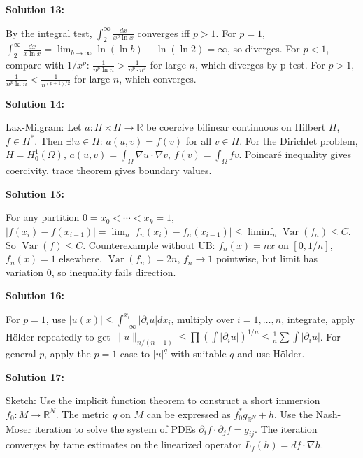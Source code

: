 \documentclass[12pt,a4paper]{exam}
\begin{document}
\vspace{0.5cm}

\textbf{Solution 13:}

By the integral test, $\int_2^{\infty} \frac{dx}{x^p \ln x}$ converges iff $p > 1$. For $p=1$, $\int_2^{\infty} \frac{dx}{x \ln x} = \lim_{b \to \infty} \ln(\ln b) - \ln(\ln 2) = \infty$, so diverges. For $p<1$, compare with $1/x^p$: $\frac{1}{n^p \ln n} > \frac{1}{n^p \cdot n^{\varepsilon}}$ for large $n$, which diverges by p-test. For $p>1$, $\frac{1}{n^p \ln n} < \frac{1}{n^{(p+1)/2}}$ for large $n$, which converges.

\vspace{0.5cm}

\textbf{Solution 14:}

Lax-Milgram: Let $a: H \times H \to \mathbb{R}$ be coercive bilinear continuous on Hilbert $H$, $f \in H^*$. Then $\exists! u \in H$: $a(u,v) = f(v)$ for all $v \in H$. For the Dirichlet problem, $H = H_0^1(\Omega)$, $a(u,v) = \int_\Omega \nabla u \cdot \nabla v$, $f(v) = \int_\Omega f v$. Poincar\'e inequality gives coercivity, trace theorem gives boundary values.

\vspace{0.5cm}

\textbf{Solution 15:}

For any partition $0 = x_0 < \cdots < x_k = 1$, $|f(x_i) - f(x_{i-1})| = \lim_n |f_n(x_i) - f_n(x_{i-1})| \leq \liminf_n \operatorname{Var}(f_n) \leq C$. So $\operatorname{Var}(f) \leq C$. Counterexample without UB: $f_n(x) = n x$ on $[0,1/n]$, $f_n(x)=1$ elsewhere. $\operatorname{Var}(f_n) = 2n$, $f_n \to 1$ pointwise, but limit has variation 0, so inequality fails direction.

\vspace{0.5cm}

\textbf{Solution 16:}

For $p=1$, use $|u(x)| \leq \int_{-\infty}^{x_i} |\partial_i u| dx_i$, multiply over $i=1,\ldots,n$, integrate, apply H\"older repeatedly to get $\|u\|_{n/(n-1)} \leq \prod (\int |\partial_i u|)^{1/n} \leq \frac{1}{n} \sum \int |\partial_i u|$. For general $p$, apply the $p=1$ case to $|u|^q$ with suitable $q$ and use H\"older.

\vspace{0.5cm}

\textbf{Solution 17:}

Sketch: Use the implicit function theorem to construct a short immersion $f_0: M \to \mathbb{R}^N$. The metric $g$ on $M$ can be expressed as $f_0^*g_{\mathbb{R}^N} + h$. Use the Nash-Moser iteration to solve the system of PDEs $\partial_i f \cdot \partial_j f = g_{ij}$. The iteration converges by tame estimates on the linearized operator $L_f(h) = df \cdot \nabla h$.
\end{document}
